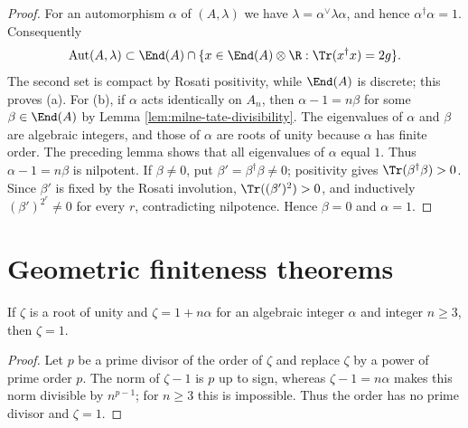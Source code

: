 \begin{proof}
For an automorphism $\alpha$ of $(A,\lambda)$ we have
$\lambda=\alpha^\vee\lambda\alpha$, and hence $\alpha^\dagger\alpha=1$.
Consequently
\[
\operatorname{Aut}(A,\lambda)\subset
\End(A)\cap\{x\in\End(A)\otimes\R:\Tr(x^\dagger x)=2g\}.
\]
The second set is compact by Rosati positivity, while $\End(A)$ is discrete;
this proves (a).  For (b), if $\alpha$ acts identically on $A_n$, then
$\alpha-1=n\beta$ for some $\beta\in\End(A)$ by Lemma
\ref{lem:milne-tate-divisibility}.  The eigenvalues of $\alpha$ and $\beta$
are algebraic integers, and those of $\alpha$ are roots of unity because
$\alpha$ has finite order.  The preceding lemma shows that all eigenvalues of
$\alpha$ equal $1$.  Thus $\alpha-1=n\beta$ is nilpotent.  If $\beta\ne0$,
put $\beta' =\beta^\dagger\beta\ne0$; positivity gives
$\Tr(\beta^\dagger\beta)>0$.  Since $\beta'$ is fixed by the Rosati
involution, $\Tr((\beta')^2)>0$, and inductively $(\beta')^{2^r}\ne0$ for
every $r$, contradicting nilpotence.  Hence $\beta=0$ and $\alpha=1$.
\end{proof}


\section{Geometric finiteness theorems}
\begin{lemma}\label{lem:milne-root-unity}
If $\zeta$ is a root of unity and $\zeta=1+n\alpha$ for an algebraic integer $\alpha$ and integer $n\ge3$, then $\zeta=1$.
\end{lemma}

\begin{proof}

Let $p$ be a prime divisor of the order of $\zeta$ and replace $\zeta$ by a
power of prime order $p$.  The norm of $\zeta-1$ is $p$ up to sign, whereas
$\zeta-1=n\alpha$ makes this norm divisible by $n^{p-1}$; for $n\ge3$ this
is impossible.  Thus the order has no prime divisor and $\zeta=1$.

\end{proof}

